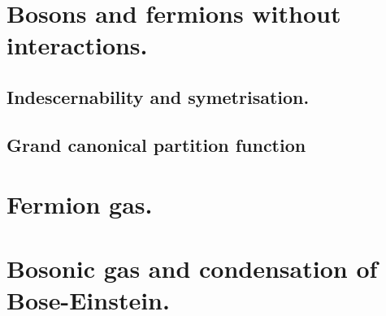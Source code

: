 \documentclass[10pt,a4paper]{book}
\begin{document}
\section{Bosons and fermions without interactions.}


\subsection{Indescernability and symetrisation.}
\subsection{Grand canonical partition function}
\section{Fermion gas.}
\section{Bosonic gas and condensation of Bose-Einstein.}
\end{document}
